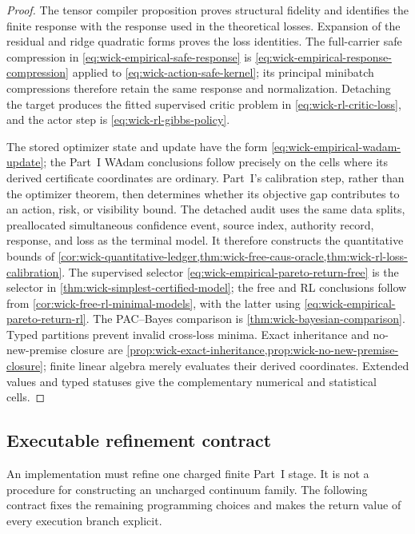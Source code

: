 \documentclass[11pt]{article}
\numberwithin{section}{part}
\theoremstyle{plain}
\theoremstyle{definition}
\theoremstyle{remark}
\begin{document}
\begin{proof}
The tensor compiler proposition proves structural fidelity and identifies
the finite response with the response used in the theoretical losses.
Expansion of the residual and ridge quadratic forms proves the loss
identities.  The full-carrier safe compression in
\eqref{eq:wick-empirical-safe-response} is
\eqref{eq:wick-empirical-response-compression} applied to
\eqref{eq:wick-action-safe-kernel}; its principal minibatch compressions
therefore retain the same response and normalization.  Detaching the target
produces the fitted supervised critic problem in
\eqref{eq:wick-rl-critic-loss}, and the actor step is
\eqref{eq:wick-rl-gibbs-policy}.

The stored optimizer state and update have the form
\eqref{eq:wick-empirical-wadam-update}; the Part~I WAdam conclusions follow
precisely on the cells where its derived certificate coordinates are
ordinary.  Part~I's calibration step, rather than the optimizer theorem,
then determines whether its objective gap contributes to an action, risk, or
visibility bound.  The detached audit uses the same data splits, preallocated
simultaneous confidence event, source index, authority record, response, and
loss as the terminal model.  It therefore constructs the quantitative bounds of
\cref{cor:wick-quantitative-ledger,thm:wick-free-caus-oracle,thm:wick-rl-loss-calibration}.
The supervised selector
\eqref{eq:wick-empirical-pareto-return-free} is the selector in
\cref{thm:wick-simplest-certified-model}; the free and RL conclusions follow
from \cref{cor:wick-free-rl-minimal-models}, with the latter using
\eqref{eq:wick-empirical-pareto-return-rl}.  The PAC--Bayes comparison is
\cref{thm:wick-bayesian-comparison}.  Typed partitions prevent invalid
cross-loss minima.  Exact inheritance and no-new-premise closure are
\cref{prop:wick-exact-inheritance,prop:wick-no-new-premise-closure}; finite
linear algebra merely evaluates their derived coordinates.  Extended values
and typed statuses give the complementary numerical and statistical cells.
\end{proof}

\subsection{Executable refinement contract}
\label{subsec:wick-executable-refinement}

An implementation must refine one charged finite Part~I stage.  It is not a
procedure for constructing an uncharged continuum family.  The following
contract fixes the remaining programming choices and makes the return value of
every execution branch explicit.
\end{document}
